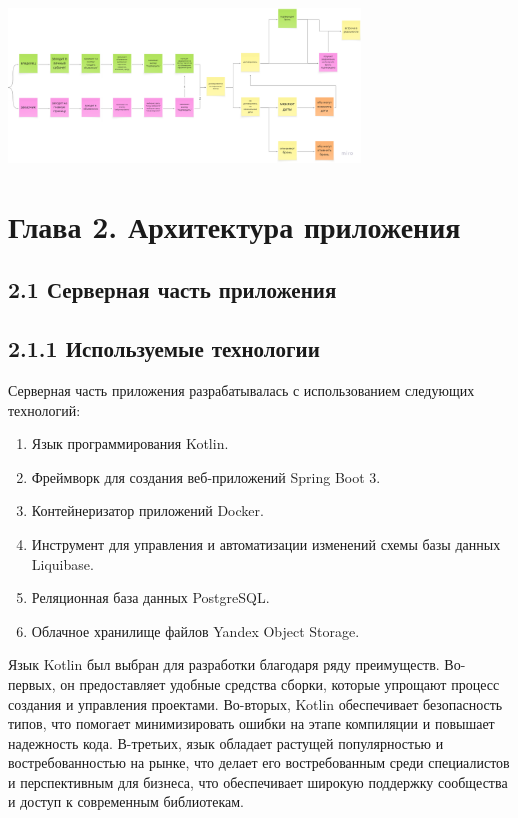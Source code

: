 \documentclass[14pt]{extarticle}
\begin{document}
\begin{center}
    \includegraphics[width=0.7\textwidth]{flow.png}
\end{center}

\newpage

\section{Глава 2. Архитектура приложения}

\subsection{2.1 Серверная часть приложения}

\subsection{2.1.1 Используемые технологии}

\bigskip

Серверная часть приложения разрабатывалась с использованием
следующих технологий:
\begin{enumerate}
    \item Язык программирования Kotlin.
    \item Фреймворк для создания веб-приложений Spring Boot 3.
    \item Контейнеризатор приложений Docker.
    \item Инструмент для управления и автоматизации изменений
        схемы базы данных Liquibase.
    \item Реляционная база данных PostgreSQL.
    \item Облачное хранилище файлов Yandex Object Storage.
\end{enumerate}

\bigskip

Язык Kotlin был выбран для разработки благодаря ряду преимуществ.
Во-первых, он предоставляет удобные средства сборки,
которые упрощают процесс создания и управления проектами.
Во-вторых, Kotlin обеспечивает безопасность типов,
что помогает минимизировать ошибки на этапе компиляции
и повышает надежность кода.
В-третьих, язык обладает растущей популярностью и востребованностью на рынке,
что делает его востребованным среди специалистов и перспективным для бизнеса,
что обеспечивает широкую поддержку сообщества и доступ к современным библиотекам.
\end{document}
